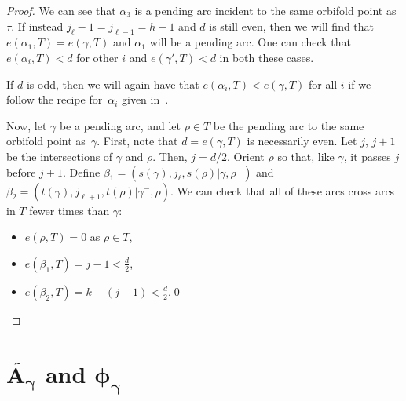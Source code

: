 \begin{proof}
We can see that $\alpha_3$ is a pending arc incident to the same orbifold point as $\tau$. If instead $j_{\ell} - 1 = j_{\ell - 1} = h-1$ and $d$ is still even, then we will find that $e(\alpha_1, T) = e(\gamma,T)$ and $\alpha_1$ will be a pending arc. One can check that $e(\alpha_i,T) < d$ for other $i$ and $e(\gamma',T) < d$ in both these cases.

\begin{center}
\end{center}

If $d$ is odd, then we will again have that $e(\alpha_i,T) < e(\gamma,T)$ for all $i$ if we follow the recipe for~$\alpha_i$ given in~\cite{MSW}.

Now, let $\gamma$ be a pending arc, and let $\rho \in T$ be the pending arc to the same orbifold point as~$\gamma$. First, note that $d = e(\gamma,T)$ is necessarily even. Let $j$, $j+1$ be the intersections of $\gamma$ and $\rho$. Then, $j = d/2$. Orient $\rho$ so that, like $\gamma$, it passes $j$ before $j + 1$. Define $\beta_1 = (s(\gamma), j_\ell, s(\rho) \vert \gamma, \rho^-)$ and $\beta_2 = (t(\gamma), j_{\ell + 1}, t(\rho) \vert \gamma^-, \rho)$. We can check that all of these arcs cross arcs in $T$ fewer times than $\gamma$:
\begin{itemize}\itemsep=0pt
\item $e(\rho, T) = 0$ as $\rho \in T$,
\item $e(\beta_1, T) = j - 1 < \frac{d}{2}$,
\item $e(\beta_2, T) = k - (j+1) < \frac{d}{2}$.\hfill \qed
\end{itemize}\renewcommand{\qed}{}
\end{proof}

\section[$\widetilde{A_\gamma}$ and $\phi_\gamma$]{$\boldsymbol{\widetilde{A_\gamma}}$ and $\boldsymbol{\phi_\gamma}$} \label{Sec:mapSection}

